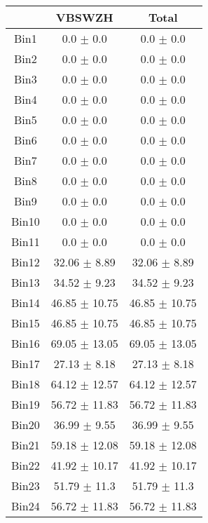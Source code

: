   \begin{tabular}{|c|c|c|}
  \hline
      & VBSWZH & Total \\ \cline{1-3} 
     \hline\hline
     Bin1 & 0.0 $\pm$ 0.0 & 0.0 $\pm$ 0.0 \\ \cline{1-3} 
     Bin2 & 0.0 $\pm$ 0.0 & 0.0 $\pm$ 0.0 \\ \cline{1-3} 
     Bin3 & 0.0 $\pm$ 0.0 & 0.0 $\pm$ 0.0 \\ \cline{1-3} 
     Bin4 & 0.0 $\pm$ 0.0 & 0.0 $\pm$ 0.0 \\ \cline{1-3} 
     Bin5 & 0.0 $\pm$ 0.0 & 0.0 $\pm$ 0.0 \\ \cline{1-3} 
     Bin6 & 0.0 $\pm$ 0.0 & 0.0 $\pm$ 0.0 \\ \cline{1-3} 
     Bin7 & 0.0 $\pm$ 0.0 & 0.0 $\pm$ 0.0 \\ \cline{1-3} 
     Bin8 & 0.0 $\pm$ 0.0 & 0.0 $\pm$ 0.0 \\ \cline{1-3} 
     Bin9 & 0.0 $\pm$ 0.0 & 0.0 $\pm$ 0.0 \\ \cline{1-3} 
     Bin10 & 0.0 $\pm$ 0.0 & 0.0 $\pm$ 0.0 \\ \cline{1-3} 
     Bin11 & 0.0 $\pm$ 0.0 & 0.0 $\pm$ 0.0 \\ \cline{1-3} 
     Bin12 & 32.06 $\pm$ 8.89 & 32.06 $\pm$ 8.89 \\ \cline{1-3} 
     Bin13 & 34.52 $\pm$ 9.23 & 34.52 $\pm$ 9.23 \\ \cline{1-3} 
     Bin14 & 46.85 $\pm$ 10.75 & 46.85 $\pm$ 10.75 \\ \cline{1-3} 
     Bin15 & 46.85 $\pm$ 10.75 & 46.85 $\pm$ 10.75 \\ \cline{1-3} 
     Bin16 & 69.05 $\pm$ 13.05 & 69.05 $\pm$ 13.05 \\ \cline{1-3} 
     Bin17 & 27.13 $\pm$ 8.18 & 27.13 $\pm$ 8.18 \\ \cline{1-3} 
     Bin18 & 64.12 $\pm$ 12.57 & 64.12 $\pm$ 12.57 \\ \cline{1-3} 
     Bin19 & 56.72 $\pm$ 11.83 & 56.72 $\pm$ 11.83 \\ \cline{1-3} 
     Bin20 & 36.99 $\pm$ 9.55 & 36.99 $\pm$ 9.55 \\ \cline{1-3} 
     Bin21 & 59.18 $\pm$ 12.08 & 59.18 $\pm$ 12.08 \\ \cline{1-3} 
     Bin22 & 41.92 $\pm$ 10.17 & 41.92 $\pm$ 10.17 \\ \cline{1-3} 
     Bin23 & 51.79 $\pm$ 11.3 & 51.79 $\pm$ 11.3 \\ \cline{1-3} 
     Bin24 & 56.72 $\pm$ 11.83 & 56.72 $\pm$ 11.83 \\ \cline{1-3} 

\end{tabular}
